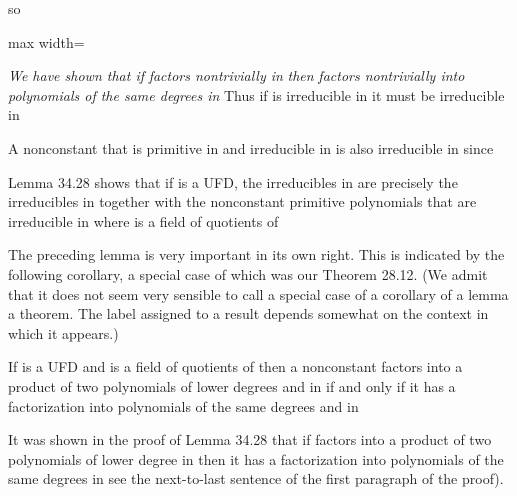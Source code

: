 \documentclass[11pt,oneside]{article}
\begin{document}
\begin{BookBody}
\noindent so

\begin{center}\begin{adjustbox}{max width=\linewidth}\end{adjustbox}\end{center}

\noindent \textit{We have shown that if}  \textit{factors nontrivially in}  \textit{then}  \textit{factors nontrivially into} \textit{polynomials of the same degrees in}  Thus if  is irreducible in  it must be irreducible in 

A nonconstant  that is primitive in  and irreducible in  is also irreducible in  since \BookEnd{\blacklozenge}

Lemma 34.28 shows that if  is a UFD, the irreducibles in  are precisely the irreducibles in  together with the nonconstant primitive polynomials that are irreducible in  where  is a field of quotients of 

The preceding lemma is very important in its own right. This is indicated by the following corollary, a special case of which was our Theorem 28.12. (We admit that it does not seem very sensible to call a special case of a corollary of a lemma a theorem. The label assigned to a result depends somewhat on the context in which it appears.)

 If  is a UFD and  is a field of quotients of  then a nonconstant  factors into a product of two polynomials of lower degrees  and  in  if and only if it has a factorization into polynomials of the same degrees  and  in 

 It was shown in the proof of Lemma 34.28 that if  factors into a product of two polynomials of lower degree in  then it has a factorization into polynomials of the same degrees in see the next-to-last sentence of the first paragraph of the proof).


\end{BookBody}
\end{document}
